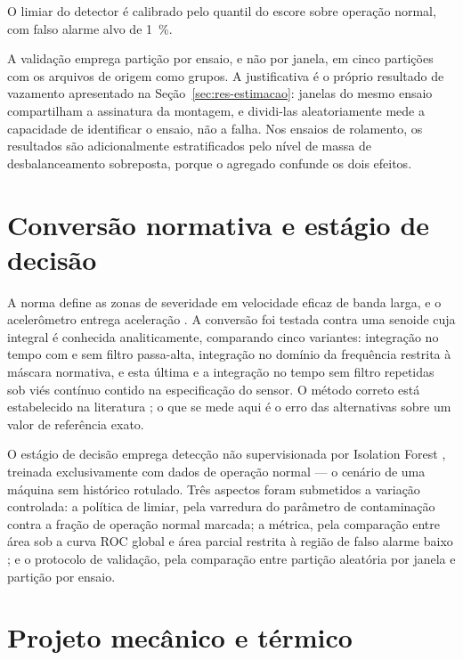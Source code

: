 O limiar do detector é calibrado pelo quantil do escore sobre operação normal, com falso
alarme alvo de \SI{1}{\percent}. 

A validação emprega partição por ensaio, e não por janela, em cinco partições com os
arquivos de origem como grupos. A justificativa é o próprio
resultado de vazamento apresentado na Seção~\ref{sec:res-estimacao}: janelas do mesmo
ensaio compartilham a assinatura da montagem, e dividi-las aleatoriamente mede a
capacidade de identificar o ensaio, não a falha. Nos ensaios de rolamento, os resultados
são adicionalmente estratificados pelo nível de massa de desbalanceamento sobreposta,
porque o agregado confunde os dois efeitos.

\section{Conversão normativa e estágio de decisão}
\label{sec:dev-estimacao}

A norma define as zonas de severidade em velocidade eficaz de banda larga, e o acelerômetro
entrega aceleração \cite{iso208163_2022}. A conversão foi testada contra uma senoide cuja
integral é conhecida analiticamente, comparando cinco variantes: integração no tempo com e
sem filtro passa-alta, integração no domínio da frequência restrita à máscara normativa, e
esta última e a integração no tempo sem filtro repetidas sob viés contínuo contido na
especificação do sensor. O método correto
está estabelecido na literatura \cite{brandt2014}; o que se mede aqui é o erro das
alternativas sobre um valor de referência exato.

O estágio de decisão emprega detecção não supervisionada por Isolation Forest
\cite{liu2008}, treinada exclusivamente com dados de operação normal --- o cenário de uma
máquina sem histórico rotulado. Três aspectos foram submetidos a variação controlada: a
política de limiar, pela varredura do parâmetro de contaminação contra a fração de operação
normal marcada; a métrica, pela comparação entre área sob a curva ROC global e área parcial
restrita à região de falso alarme baixo \cite{koizumi2020}; e o protocolo de validação,
pela comparação entre partição aleatória por janela e partição por ensaio.

\section{Projeto mecânico e térmico}
\label{sec:dev-mecanica}

